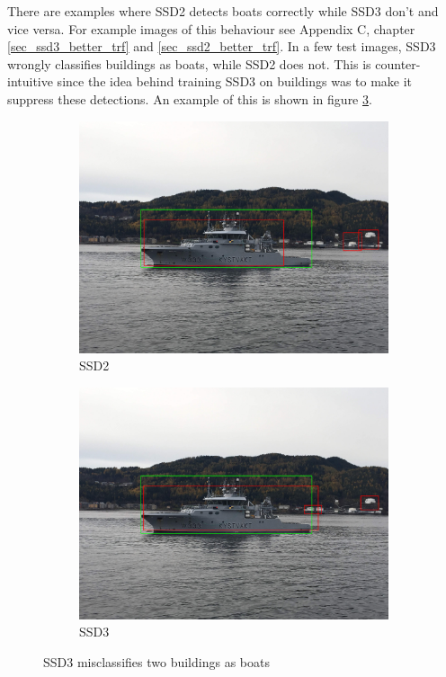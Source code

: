 There are examples where SSD2 detects boats correctly while SSD3 don't and vice versa. For example images of this behaviour see Appendix C, chapter \ref{sec_ssd3_better_trf} and \ref{sec_ssd2_better_trf}. In a few test images, SSD3 wrongly classifies buildings as boats, while SSD2 does not. This is counter-intuitive since the idea behind training SSD3 on buildings was to make it suppress these detections. An example of this is shown in figure \ref{fig:ssd3_misclassify}.

\begin{figure}[h!]
\begin{subfigure}{.5\textwidth}
  \centering
  \includegraphics[width=0.8\linewidth]{results/case_buildings/ssdtrf/ssd2/grov3/IMG_2680.jpg}
  \caption{SSD2}
  \label{fig:ex_trf_prec_rec_yolo}
\end{subfigure}%
\begin{subfigure}{.5\textwidth}
  \centering
  \includegraphics[width=.8\linewidth]{results/case_buildings/ssdtrf/ssd3/grov3/IMG_2680.jpg}
  \caption{SSD3}
  \label{fig:ex_trf_prec_rec_ssd}
\end{subfigure}
\caption{SSD3 misclassifies two buildings as boats}
\label{fig:ssd3_misclassify}
\end{figure}

